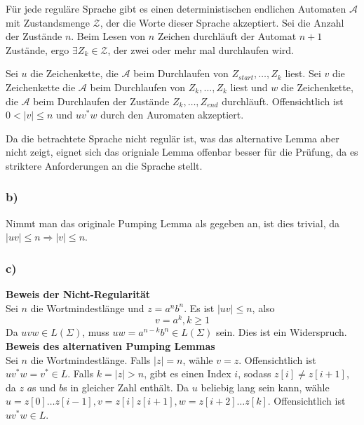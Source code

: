 \documentclass{article}
\begin{document}
      F\"ur jede regul\"are Sprache gibt es einen deterministischen endlichen
      Automaten $\mathcal{A}$ mit Zustandsmenge $\mathcal{Z}$, der die Worte
      dieser Sprache akzeptiert. Sei die Anzahl der Zust\"ande $n$. Beim Lesen
      von $n$ Zeichen durchl\"auft der Automat $n+1$ Zust\"ande, ergo $\exists
      Z_k \in \mathcal{Z}$, der zwei oder mehr mal durchlaufen wird. 
      
      Sei $u$ die
      Zeichenkette, die $\mathcal{A}$ beim Durchlaufen von
      $Z_{start},\ldots,Z_k$ liest. Sei $v$ die Zeichenkette die $\mathcal{A}$
      beim Durchlaufen von $Z_k,\ldots,Z_k$ liest und $w$ die Zeichenkette, die
      $\mathcal{A}$ beim Durchlaufen der Zust\"ande $Z_k,\ldots,Z_{end}$
      durchl\"auft. Offensichtlich ist $0 < |v| \le n$ und $uv^*w$ durch den
      Auromaten akzeptiert.

      Da die betrachtete Sprache nicht regul\"ar ist, was das alternative Lemma
      aber nicht zeigt, eignet sich das origniale Lemma offenbar besser f\"ur
      die Pr\"ufung, da es striktere Anforderungen an die Sprache stellt.

      \subsubsection{b)}
      
      Nimmt man das originale Pumping Lemma als gegeben an, ist dies trivial, da
      $|uv| \le n \Rightarrow |v| \le n$.

      \subsubsection{c)}

      \textbf{Beweis der Nicht-Regularit\"at}\\[\baselineskip]
      Sei $n$ die Wortmindestl\"ange und $z = a^nb^n$. Es ist $|uv| \le n$, also
      \begin{equation*}
         v = a^k, k \ge 1
      \end{equation*}
      Da $uvw \in L(\Sigma)$, muss $uw = a^{n-k}b^n\in L(\Sigma)$ sein. Dies ist
      ein Widerspruch.\\[\baselineskip]

      \noindent\textbf{Beweis des alternativen Pumping Lemmas}\\[\baselineskip]
      Sei $n$ die Wortmindestl\"ange. Falls $|z| = n$, w\"ahle $v = z$.
      Offensichtlich ist $uv^*w = v^* \in L$. Falls $k = |z| > n$, gibt es einen
      Index $i$, sodass $z[i]\neq z[i+1]$, da $z$ $a$s und $b$s in gleicher Zahl
      enth\"alt. Da $u$ beliebig lang sein kann, w\"ahle $u = z[0]\ldots z[i-1], 
      v = z[i]z[i+1], w = z[i+2]\ldots z[k]$. Offensichtlich ist $uv^*w \in L$.
\end{document}

